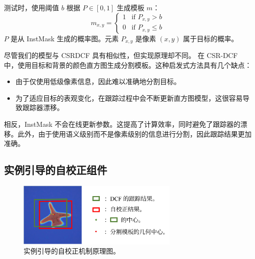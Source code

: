 测试时，使用阈值 $b$ 根据 $P\in [0, 1]$ 生成模板 $m$：
\begin{equation}
m_{x,y} = \left\{ \begin{array}{ll}
 1 & \textrm{if $P_{x,y} > b$}\\
 0 & \textrm{if $P_{x,y} \le b$}
 \end{array} \right.
\end{equation}
$P$ 是从 InstMask 生成的概率图。元素 $P_{x,y}$ 是像素 $(x,y)$ 属于目标的概率。

尽管我们的模型与 CSRDCF \cite{Lukezic2017DiscriminativeCF} 具有相似性，但实现原理却不同。
在 
CSR-DCF 
\cite{Lukezic2017DiscriminativeCF} 
中，使用目标和背景的颜色直方图生成分割模板。这种启发式方法具有几个缺点：

\begin{itemize}
\item 由于仅使用低级像素信息，因此难以准确地分割目标。
\item 为了适应目标的表观变化，在跟踪过程中会不断更新直方图模型，这很容易导致跟踪器漂移。
\end{itemize}

相反，InstMask 不会在线更新参数。这提高了计算效率，同时避免了跟踪器的漂移。此外，由于使用语义级别而不是像素级别的信息进行分割，因此跟踪结果更加准确。

\subsection{实例引导的自校正组件} \label{sec:cog}

\begin{figure}[t]
    \centering
    \includegraphics[width=0.7\textwidth]{Img/IGCF/cog_arch.pdf}
    \caption{实例引导的自校正机制原理图。}
    \label{fig:cog}
\end{figure}

